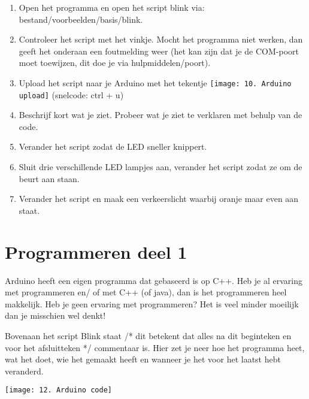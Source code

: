\documentclass{arduino}
\begin{document}
\begin{enumerate}[label={\alph*})]
\item Open het programma en open het script blink via: bestand/voorbeelden/basis/blink.

\item Controleer het script met het vinkje. Mocht het programma niet werken, dan geeft het onderaan een foutmelding weer (het kan zijn dat je de COM-poort moet toewijzen, dit doe je via hulpmiddelen/poort).

\item Upload het script naar je Arduino met het tekentje \texttt{[image: 10. Arduino upload]} (snelcode: ctrl + u)

\item Beschrijf kort wat je ziet. Probeer wat je ziet te verklaren met behulp van de code.

\item Verander het script zodat de LED sneller knippert.

\item Sluit drie verschillende LED lampjes aan, verander het script zodat ze om de beurt aan staan.

\item Verander het script en maak een verkeerslicht waarbij oranje maar even aan staat.
\end{enumerate}

\newpage

\newlength{\biggraphicwithtext}
\setlength{\biggraphicwithtext}{\dimexpr(\textwidth+65mm)\relax}
\setlength{\textwidthnexttobiggraphic}{\dimexpr(\biggraphicwithtext-120mm)\relax}
\begin{minipage}{\biggraphicwithtext}
\begin{minipage}{\textwidthnexttobiggraphic}
\section{Programmeren deel 1}\vspace{\baselineskip}

Arduino heeft een eigen programma dat gebaseerd is op C++. Heb je al ervaring met programmeren en/ of met C++ (of java), dan is het programmeren heel makkelijk. Heb je geen ervaring met programmeren? Het is veel minder moeilijk dan je misschien wel denkt!\vspace{\baselineskip}

Bovenaan het script Blink staat /* dit betekent dat alles na dit beginteken en voor het afsluitteken */ commentaar is. Hier zet je neer hoe het programma heet, wat het doet, wie het gemaakt heeft en wanneer je het voor het laatst hebt veranderd.
\end{minipage}\hfill\begin{minipage}{12cm}
\raggedleft
\texttt{[image: 12. Arduino code]}
\end{minipage}
\end{minipage}
\end{document}
